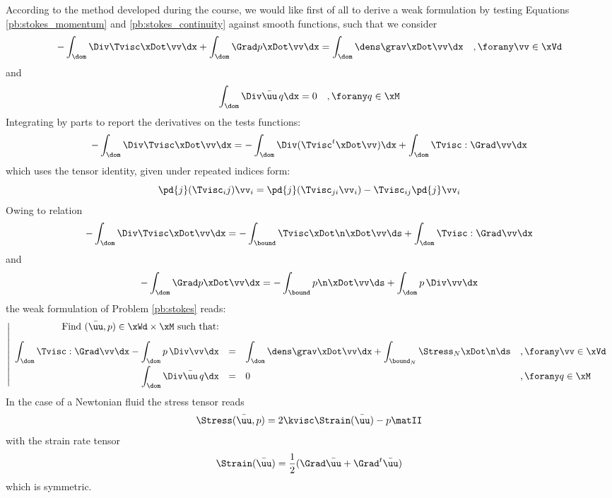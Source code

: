 \medskip
According to the method developed during the course, we would like first of all to derive a weak formulation by testing Equations \eqref{pb:stokes_momentum} and \eqref{pb:stokes_continuity} against smooth functions, such that we consider
\begin{equation*}
- \int_\dom \Div\Tvisc\xDot\vv\dx + \int_\dom \Grad p \xDot \vv\dx = \int_\dom \dens\grav\xDot\vv\dx\quad,\forany\vv\in\xVd
\end{equation*}
and
\begin{equation*}
\int_\dom \Div\bar\uu\,q\dx = 0\quad,\forany q\in\xM
\end{equation*}
Integrating by parts to report the derivatives on the tests functions:
\begin{equation*}
- \int_\dom \Div\Tvisc\xDot\vv\dx = - \int_\dom \Div(\Tvisc^t\xDot\vv)\dx + \int_\dom \Tvisc:\Grad\vv\dx
\end{equation*}
which uses the tensor identity, given under repeated indices form:
\begin{equation*}
\pd{j}(\Tvisc_ij)\vv_i = \pd{j}(\Tvisc_{ji}\vv_i) - \Tvisc_{ij}\pd{j}\vv_i
\end{equation*}
Owing to relation
\begin{equation*}
- \int_\dom \Div\Tvisc\xDot\vv\dx = - \int_\bound \Tvisc\xDot\n\xDot\vv\ds + \int_\dom \Tvisc:\Grad\vv\dx
\end{equation*}
and
\begin{equation*}
- \int_\dom \Grad p\xDot\vv\dx = - \int_\bound p \n\xDot\vv\ds + \int_\dom p\,\Div\vv\dx
\end{equation*}
the weak formulation of Problem \eqref{pb:stokes} reads:
\begin{equation*}\label{pb:stokes_weak}
\left\vert
\begin{array}{rlll}
\mbox{Find $(\bar\uu,p)\in \xWd\times\xM$ such that:}\\[2ex]
\displaystyle \int_\dom \Tvisc:\Grad\vv\dx - \int_\dom p\,\Div\vv\dx &=& \displaystyle\int_\dom \dens\grav\xDot\vv\dx + \int_{\bound_N}\Stress_N\xDot\n\ds & ,\forany\vv\in\xVd\\[2ex]
\displaystyle \int_\dom \Div\bar\uu\,q\dx &=& 0 & ,\forany q\in\xM
\end{array}
\right.
\end{equation*}
In the case of a Newtonian fluid the stress tensor reads
\begin{equation*}
\Stress(\bar\uu,p) = 2\kvisc\Strain(\bar\uu) - p \matII
\end{equation*}
with the strain rate tensor
\begin{equation*}
\Strain(\bar\uu) = \dfrac{1}{2}(\Grad\bar\uu + \Grad^t\bar\uu)
\end{equation*}
which is symmetric.

